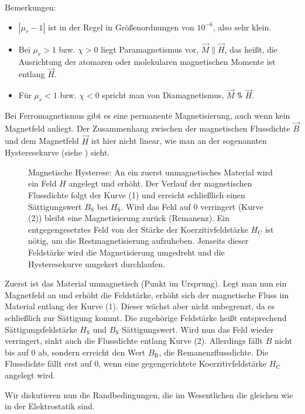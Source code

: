 Bemerkungen:
\begin{itemize}
	\item $\left| \mu _{r}-1\right| $ ist in der Regel in Größenordnungen von $10^{-6}$, also sehr klein.

	\item Bei $\mu _{r}>1$ bzw. $\chi >0$ liegt Paramagnetismus vor, $\vec {M}\parallel \vec {H}$, das heißt, die Ausrichtung der atomaren oder molekularen magnetischen Momente ist entlang $\vec {H}$.

	\item Für $\mu _{r}<1$ bzw. $\chi <0$ spricht man von Diamagnetismus, $\vec {M}\updownharpoons \vec {H}$.
\end{itemize}


Bei Ferromagnetismus gibt es eine permanente Magnetisierung, auch wenn kein Magnetfeld anliegt. Der Zusammenhang zwischen der magnetischen Flussdichte $\vec {B}$ und dem Magnetfeld $\vec {H}$ ist hier nicht linear, wie man an der sogenannten Hysteresekurve (siehe ) sieht.

\begin{figure}
	\centering
	\tfighysterese
	\caption{Magnetische Hysterese: An ein zuerst unmagnetisches Material wird ein Feld $H$ angelegt und erhöht. Der Verlauf der magnetischen Flussdichte folgt der Kurve (1) und erreicht schließlich einen Sättigungswert $B_\mathrm{S}$ bei $H_\mathrm{S}$. Wird das Feld auf 0 verringert (Kurve (2)) bleibt eine Magnetisierung zurück (Remanenz). Ein entgegengesetztes Feld von der Stärke der Koerzitivfeldstärke $H_\mathrm{C}$ ist nötig, um die Restmagnetisierung aufzuheben. Jenseits dieser Feldstärke wird die Magnetisierung umgedreht und die Hysteresekurve umgekert durchlaufen. }
	\label{fig:hysterese}
\end{figure}
Zuerst ist das Material unmagnetisch (Punkt im Ursprung). Legt man nun ein Magnetfeld an und erhöht die Feldstärke, erhöht sich der magnetische Fluss im Material entlang der Kurve (1). Dieser wächst aber nicht unbegrenzt, da es schließlich zur Sättigung kommt. Die zugehörige Feldstärke heißt entsprechend Sättigungsfeldstärke $H_{\mathrm{S}}$ und $B_{\mathrm{S}}$ Sättigungswert. Wird nun das Feld wieder verringert, sinkt auch die Flussdichte entlang Kurve (2). Allerdings fällt $B$ nicht bis auf $0$ ab, sondern erreicht den Wert $B_{\mathrm{R}}$, die Remanenzflussdichte. Die Flussdichte fällt erst auf $0$, wenn eine gegengerichtete Koerzitivfeldstärke $H_{\mathrm{C}}$ angelegt wird.

Wir diskutieren nun die Randbedingungen, die im Wesentlichen die gleichen wie in der Elektrostatik sind.

